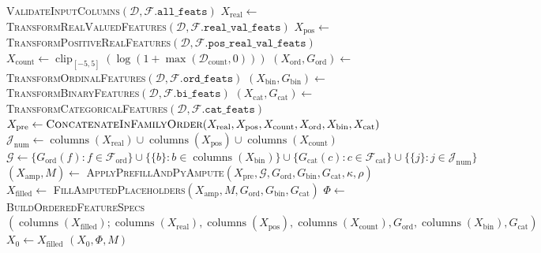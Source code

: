 \begin{algorithm}[ht]
\begin{algorithmic}[1]
    \State \textsc{ValidateInputColumns}$(\mathcal D, \mathcal F.\texttt{all\_feats})$
    \State $X_{\text{real}} \gets$ \textsc{TransformRealValuedFeatures}$(\mathcal D, \mathcal F.\texttt{real\_val\_feats})$ 
    \State $X_{\text{pos}} \gets$ \textsc{TransformPositiveRealFeatures}$(\mathcal D, \mathcal F.\texttt{pos\_real\_val\_feats})$ 
    \State $X_{\text{count}} \gets \operatorname{clip}_{[-5,5]}\!\left(\log\!\left(1+\max(\mathcal D_{\text{count}},0)\right)\right)$
    \State $(X_{\text{ord}}, G_{\text{ord}}) \gets$ \textsc{TransformOrdinalFeatures}$(\mathcal D, \mathcal F.\texttt{ord\_feats})$ 
    \State $(X_{\text{bin}}, G_{\text{bin}}) \gets$ \textsc{TransformBinaryFeatures}$(\mathcal D, \mathcal F.\texttt{bi\_feats})$ 
    \State $(X_{\text{cat}}, G_{\text{cat}}) \gets$ \textsc{TransformCategoricalFeatures}$(\mathcal D, \mathcal F.\texttt{cat\_feats})$ 
    \State $X_{\text{pre}} \gets \textsc{ConcatenateInFamilyOrder}(X_{\text{real}}, X_{\text{pos}}, X_{\text{count}}, X_{\text{ord}}, X_{\text{bin}}, X_{\text{cat}})$
    \State $\mathcal J_{\text{num}} \gets \operatorname{columns}(X_{\text{real}}) \cup \operatorname{columns}(X_{\text{pos}}) \cup \operatorname{columns}(X_{\text{count}})$
    \State $\mathcal G \gets \{G_{\text{ord}}(f): f\in\mathcal F_{\text{ord}}\} \cup \{\{b\}: b\in\operatorname{columns}(X_{\text{bin}})\} \cup \{G_{\text{cat}}(c): c\in\mathcal F_{\text{cat}}\} \cup \{\{j\}:j\in\mathcal J_{\text{num}}\}$
    \State $(X_{\text{amp}}, M) \gets$ \textsc{ApplyPrefillAndPyAmpute}$(X_{\text{pre}}, \mathcal G, G_{\text{ord}}, G_{\text{bin}}, G_{\text{cat}}, \kappa, \rho)$
    \State $X_{\text{filled}} \gets$ \textsc{FillAmputedPlaceholders}$(X_{\text{amp}}, M, G_{\text{ord}}, G_{\text{bin}}, G_{\text{cat}})$
    \State $\Phi \gets$ \textsc{BuildOrderedFeatureSpecs}$(\operatorname{columns}(X_{\text{filled}}); \operatorname{columns}(X_{\text{real}}), \operatorname{columns}(X_{\text{pos}}), \operatorname{columns}(X_{\text{count}}), G_{\text{ord}}, \operatorname{columns}(X_{\text{bin}}), G_{\text{cat}})$
    \State $X_0 \gets X_{\text{filled}}$
    \State \Return $(X_0, \Phi, M)$
  \EndProcedure


\end{algorithmic}
\end{algorithm}
